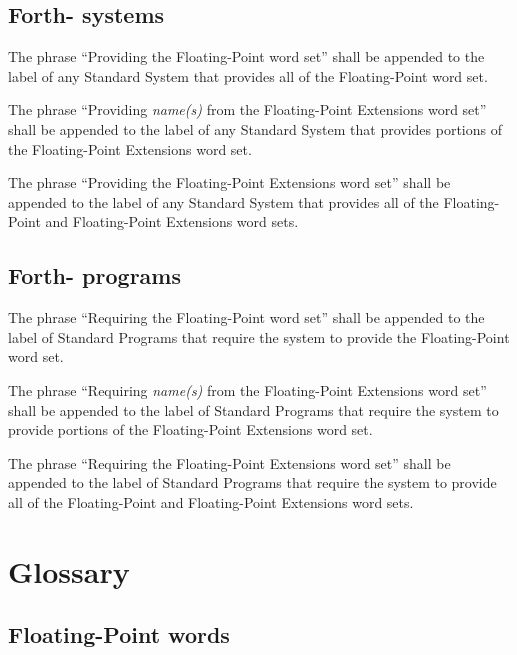 \subsection{Forth-\snapshot{} systems} %

The phrase ``Providing the Floating-Point word set'' shall be
appended to the label of any Standard System that provides all of
the Floating-Point word set.

The phrase ``Providing \emph{name(s)} from the Floating-Point
Extensions word set'' shall be appended to the label of any Standard
System that provides portions of the Floating-Point Extensions word
set.

The phrase ``Providing the Floating-Point Extensions word set'' shall
be appended to the label of any Standard System that provides all of
the Floating-Point and Floating-Point Extensions word sets.

\subsection{Forth-\snapshot{} programs} %

The phrase ``Requiring the Floating-Point word set'' shall be
appended to the label of Standard Programs that require the system
to provide the Floating-Point word set.

The phrase ``Requiring \emph{name(s)} from the Floating-Point
Extensions word set'' shall be appended to the label of Standard
Programs that require the system to provide portions of the
Floating-Point Extensions word set.

The phrase ``Requiring the Floating-Point Extensions word set'' shall
be appended to the label of Standard Programs that require the system
to provide all of the Floating-Point and Floating-Point Extensions
word sets.


\section{Glossary} %

\subsection{Floating-Point words} %


